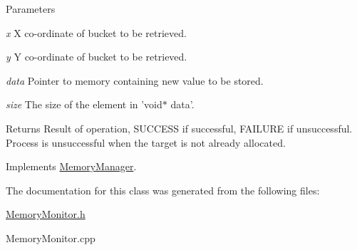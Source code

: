 \begin{DoxyParams}{Parameters}
\item[{\em x}]X co-\/ordinate of bucket to be retrieved. \item[{\em y}]Y co-\/ordinate of bucket to be retrieved. \item[{\em data}]Pointer to memory containing new value to be stored. \item[{\em size}]The size of the element in 'void$\ast$ data'.\end{DoxyParams}
\begin{DoxyReturn}{Returns}
Result of operation, SUCCESS if successful, FAILURE if unsuccessful. Process is unsuccessful when the target is not already allocated. 
\end{DoxyReturn}


Implements \hyperlink{classMemoryManager_a53a7f4663f763985ce93f36d76d08370}{MemoryManager}.



The documentation for this class was generated from the following files:\begin{DoxyCompactItemize}
\item 
\hyperlink{MemoryMonitor_8h}{MemoryMonitor.h}\item 
MemoryMonitor.cpp\end{DoxyCompactItemize}
